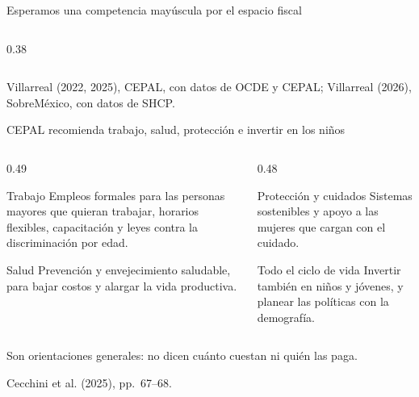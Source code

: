 \documentclass[aspectratio=169,11pt]{beamer}
\newcommand{\fuente}[1]{\par\vfill{\small\color{cGris}#1\par}}
\begin{document}
\begin{frame}{Esperamos una competencia mayúscula por el espacio fiscal}
\begin{columns}[T]
\begin{column}{0.38\textwidth}
    \end{column}
  \end{columns}
  \fuente{Villarreal (2022, 2025), CEPAL, con datos de OCDE y CEPAL; Villarreal (2026), SobreMéxico, con datos de SHCP.}
\end{frame}

\begin{frame}{CEPAL recomienda trabajo, salud, protección e invertir en los niños}
  \begin{columns}[T]
    \begin{column}{0.49\textwidth}
      \begin{block}{Trabajo}
        Empleos formales para las personas mayores que quieran trabajar, horarios flexibles, capacitación y leyes contra la discriminación por edad.
      \end{block}
      \begin{block}{Salud}
        Prevención y envejecimiento saludable, para bajar costos y alargar la vida productiva.
      \end{block}
    \end{column}
    \begin{column}{0.48\textwidth}
      \begin{block}{Protección y cuidados}
        Sistemas sostenibles y apoyo a las mujeres que cargan con el cuidado.
      \end{block}
      \begin{block}{Todo el ciclo de vida}
        Invertir también en niños y jóvenes, y planear las políticas con la demografía.
      \end{block}
    \end{column}
  \end{columns}
  \pause
  \par\medskip
  Son orientaciones generales: no dicen cuánto cuestan ni quién las paga.
  \fuente{Cecchini et al. (2025), pp.~67--68.}
\end{frame}
\end{document}

